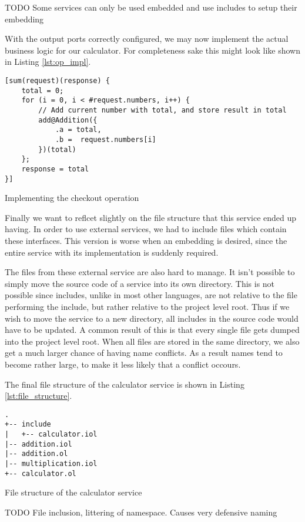 \begin{observation}
    TODO Some services can only be used embedded and use includes to setup
    their embedding
\end{observation}

With the output ports correctly configured, we may now implement the actual
business logic for our calculator. For completeness sake this might look like
shown in Listing \ref{lst:op_impl}.

\begin{listing}[H]
\begin{verbatim}
[sum(request)(response) {
    total = 0;
    for (i = 0, i < #request.numbers, i++) {
        // Add current number with total, and store result in total
        add@Addition({
            .a = total,
            .b =  request.numbers[i]
        })(total)
    };
    response = total
}]
\end{verbatim}
\caption{Implementing the checkout operation}
\label{lst:op_impl}
\end{listing}

Finally we want to reflcet slightly on the file structure that this service
ended up having. In order to use external services, we had to include files
which contain these interfaces. This version is worse when an embedding is
desired, since the entire service with its implementation is suddenly required.

The files from these external service are also hard to manage. It isn't
possible to simply move the source code of a service into its own directory.
This is not possible since includes, unlike in most other languages, are not
relative to the file performing the include, but rather relative to the project
level root. Thus if we wish to move the service to a new directory, all
includes in the source code would have to be updated. A common result of this
is that every single file gets dumped into the project level root. When all
files are stored in the same directory, we also get a much larger chance of
having name conflicts. As a result names tend to become rather large, to make
it less likely that a conflict occours.

The final file structure of the calculator service is shown in Listing
\ref{lst:file_structure}.

\begin{listing}[H]
\begin{verbatim}
.
+-- include
|   +-- calculator.iol
|-- addition.iol
|-- addition.ol
|-- multiplication.iol
+-- calculator.ol
\end{verbatim}
\caption{File structure of the calculator service}
\label{lst:file_structure}
\end{listing}


\begin{observation}
    TODO File inclusion, littering of namespace. Causes very defensive naming
\end{observation}
